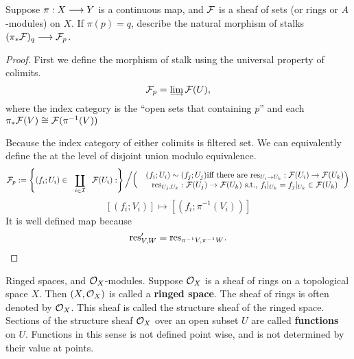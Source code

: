 \begin{exr}\label{chap2exr:Pushforward_induces_morphism_stalks}
Suppose $\pi: X \longrightarrow Y $ is a continuous map, and ${\cal F}$ is a sheaf of sets (or rings or $A$-modules) on $X$. If $ \pi(p) = q$, describe the natural morphism of stalks $(\pi_*{\cal F})_q \longrightarrow {\cal F}_p$.
\end{exr}
\begin{proof}
First we define the morphism of stalk using the universal property of colimits.
$$
\calf_p=\dirlim\calf(U),
$$
 where the index category is the ``open sets that containing $p$'' and each $\pi_*{\cal F}(V)\cong {\cal F}(\pi^{-1}(V))$
\begin{center}
\end{center}
Because the index category of either colimits is filtered set. We can equivalently define the at the level of disjoint union modulo equivalence. 
$$
\calf_p:=\left\{(f_i; U_i)\in\coprod_{i\in\cali} \calf(U_i):\right\}\left/
\left(
\begin{matrix}
& (f_i;U_i)\sim (f_j;U_j)\text{iff there are $\res_{U_i\rta U_k}:\calf(U_i)\rta \calf(U_k)$}\\
&\text{$\res_{U_j,U_k}:\calf(U_j)\rta \calf(U_k)$ s.t., $f_i|_{U_k}=f_j|_{U_k}\in \calf(U_k)$}
\end{matrix}
\right)
\right.
$$
$$
[(f_i;V_i)]\mapsto [(f_i;\pi^{-1}(V_i))]
$$
It is well defined map because
$$
\text{res}'_{V,W}=\text{res}_{\pi^{-1}V,\pi^{-1}W}.
$$
\end{proof}

\begin{definition}
Ringed spaces, and ${\cal O}_X$-modules. Suppose ${\cal O}_X$ is a sheaf of rings on a topological space $X$. Then $(X,{\cal O}_X)$ is called a \textbf{ringed space}. The sheaf of rings is often denoted by ${\cal O}_X$. This sheaf is called the structure sheaf of the ringed space. Sections of the structure sheaf ${\cal O}_X$ over an open subset $U$ are called \textbf{functions} on $U$. Functions in this sense is not defined point wise, and is not determined by their value at points.
\end{definition}

